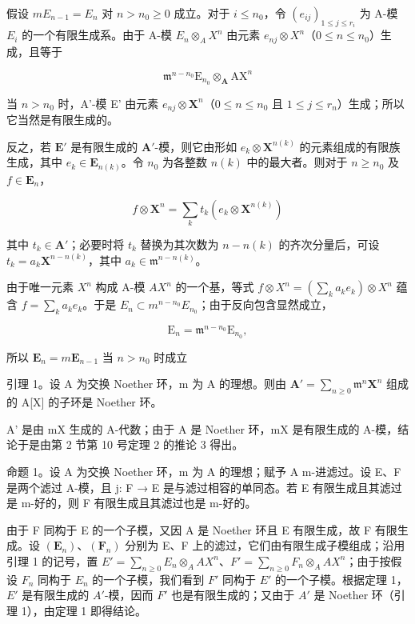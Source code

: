 假设 \(mE_{n-1} = E_n\) 对 \(n > n_0 \geqslant 0\) 成立。对于 \(i \leqslant n_0\)，令 \((e_{ij})_{1 \leqslant j \leqslant r_i}\) 为 A-模 \(E_i\) 的一个有限生成系。由于 A-模 \(E_n \otimes_A X^n\) 由元素 \(e_{nj} \otimes X^n\)（\(0 \leqslant n \leqslant n_0\)）生成，且等于

\[
\mathfrak {m} ^ {n - n _ {0}} \mathrm{E} _ {n _ {0}} \otimes_ {\mathbf {A}} \mathrm{AX} ^ {n}
\]

当 \(n > n_0\) 时，A'-模 E' 由元素 \(e_{nj} \otimes \mathbf{X}^n\)（\(0 \leqslant n \leqslant n_0\) 且 \(1 \leqslant j \leqslant r_n\)）生成；所以它当然是有限生成的。

反之，若 \(\mathbf{E}'\) 是有限生成的 \(\mathbf{A}'\)-模，则它由形如 \(e_k \otimes \mathbf{X}^{n(k)}\) 的元素组成的有限族生成，其中 \(e_k \in \mathbf{E}_{n(k)}\)。令 \(n_0\) 为各整数 \(n(k)\) 中的最大者。则对于 \(n \geqslant n_0\) 及 \(f \in \mathbf{E}_n\)，

\[
f \otimes \mathbf {X} ^ {n} = \sum_ {k} t _ {k} (e _ {k} \otimes \mathbf {X} ^ {n (k)})
\]

其中 \(t_k \in \mathbf{A}'\)；必要时将 \(t_k\) 替换为其次数为 \(n - n(k)\) 的齐次分量后，可设 \(t_k = a_k \mathbf{X}^{n - n(k)}\)，其中 \(a_k \in \mathfrak{m}^{n - n(k)}\)。

由于唯一元素 \(X^{n}\) 构成 A-模 \(AX^{n}\) 的一个基，等式 \(f \otimes X^{n} = \left( \sum_{k} a_{k} e_{k} \right) \otimes X^{n}\) 蕴含 \(f = \sum_{k} a_{k} e_{k}\)。于是 \(E_{n} \subset m^{n-n_{0}} E_{n_{0}}\)；由于反向包含显然成立，

\[
\mathrm{E} _ {n} = \mathfrak {m} ^ {n - n _ {0}} \mathrm{E} _ {n _ {0}},
\]

所以 \(\mathbf{E}_n = m\mathbf{E}_{n - 1}\) 当 \(n > n_0\) 时成立

引理 1。设 A 为交换 Noether 环，m 为 A 的理想。则由 \(\mathbf{A}' = \sum_{n\geqslant 0}\mathfrak{m}^n\mathbf{X}^n\) 组成的 A{[}X{]} 的子环是 Noether 环。

A' 是由 mX 生成的 A-代数；由于 A 是 Noether 环，mX 是有限生成的 A-模，结论于是由第 2 节第 10 号定理 2 的推论 3 得出。

命题 1。设 A 为交换 Noether 环，m 为 A 的理想；赋予 A m-进滤过。设 E、F 是两个滤过 A-模，且 j: F → E 是与滤过相容的单同态。若 E 有限生成且其滤过是 m-好的，则 F 有限生成且其滤过也是 m-好的。

由于 F 同构于 E 的一个子模，又因 A 是 Noether 环且 E 有限生成，故 F 有限生成。设 \((\mathbf{E}_{n})\)、\((\mathbf{F}_{n})\) 分别为 E、F 上的滤过，它们由有限生成子模组成；沿用引理 1 的记号，置 \(E' = \sum_{n \geqslant 0} E_{n} \otimes_{A} AX^{n}\)、\(F' = \sum_{n \geqslant 0} F_{n} \otimes_{A} AX^{n}\)；由于按假设 \(F_{n}\) 同构于 \(E_{n}\) 的一个子模，我们看到 \(F'\) 同构于 \(E'\) 的一个子模。根据定理 1，\(E'\) 是有限生成的 \(A'\)-模，因而 \(F'\) 也是有限生成的；又由于 \(A'\) 是 Noether 环（引理 1），由定理 1 即得结论。

